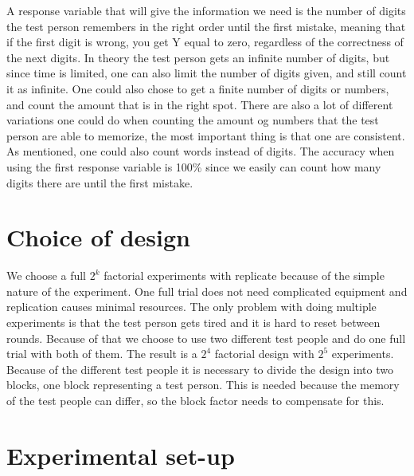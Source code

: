 \documentclass[]{article}
\begin{document}
A response variable that will give the information we need is the number
of digits the test person remembers in the right order until the first
mistake, meaning that if the first digit is wrong, you get Y equal to
zero, regardless of the correctness of the next digits. In theory the
test person gets an infinite number of digits, but since time is
limited, one can also limit the number of digits given, and still count
it as infinite. One could also chose to get a finite number of digits or
numbers, and count the amount that is in the right spot. There are also
a lot of different variations one could do when counting the amount og
numbers that the test person are able to memorize, the most important
thing is that one are consistent. As mentioned, one could also count
words instead of digits. The accuracy when using the first response
variable is 100\% since we easily can count how many digits there are
until the first mistake.

\section{Choice of design}\label{choice-of-design}

We choose a full \(2^k\) factorial experiments with replicate because of
the simple nature of the experiment. One full trial does not need
complicated equipment and replication causes minimal resources. The only
problem with doing multiple experiments is that the test person gets
tired and it is hard to reset between rounds. Because of that we choose
to use two different test people and do one full trial with both of
them. The result is a \(2^4\) factorial design with \(2^5\) experiments.
Because of the different test people it is necessary to divide the
design into two blocks, one block representing a test person. This is
needed because the memory of the test people can differ, so the block
factor needs to compensate for this.

\section{Experimental set-up}\label{experimental-set-up}
\end{document}
